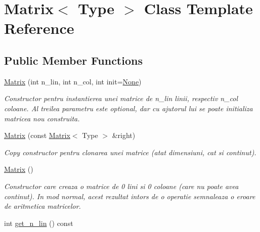 \hypertarget{classMatrix}{
\section{Matrix$<$ Type $>$ Class Template Reference}
\label{classMatrix}
}
\subsection*{Public Member Functions}
\begin{DoxyCompactItemize}
\item 
\hyperlink{classMatrix_a4543e4dacf7cfa454e45f2a3d655cb99}{Matrix} (int n\_\-lin, int n\_\-col, int init=\hyperlink{classMatrix_ac576343229d4c60eb7270123baf1eb08}{None})
\begin{DoxyCompactList}\small\item\em Constructor pentru instantierea unei matrice de {\itshape n\_\-lin\/} linii, respectiv {\itshape n\_\-col\/} coloane. Al treilea parametru este optional, dar cu ajutorul lui se poate initializa matricea nou construita. \item\end{DoxyCompactList}\item 
\hyperlink{classMatrix_a26ec7ce757009a97599b048379466841}{Matrix} (const \hyperlink{classMatrix}{Matrix}$<$ Type $>$ \&right)
\begin{DoxyCompactList}\small\item\em Copy constructor pentru clonarea unei matrice (atat dimensiuni, cat si continut). \item\end{DoxyCompactList}\item 
\hypertarget{classMatrix_ae653bc04255a76bf5275bfce4aec0e5f}{
\hyperlink{classMatrix_ae653bc04255a76bf5275bfce4aec0e5f}{Matrix} ()}
\label{classMatrix_ae653bc04255a76bf5275bfce4aec0e5f}

\begin{DoxyCompactList}\small\item\em Constructor care creaza o matrice de 0 lini si 0 coloane (care nu poate avea continut). In mod normal, acest rezultat intors de o operatie semnaleaza o eroare de aritmetica matricelor. \item\end{DoxyCompactList}\item 
\hypertarget{classMatrix_a3f2bd634a34d187bc3f5f4b1556ae8d6}{
int \hyperlink{classMatrix_a3f2bd634a34d187bc3f5f4b1556ae8d6}{get\_\-n\_\-lin} () const }
\label{classMatrix_a3f2bd634a34d187bc3f5f4b1556ae8d6}


\end{DoxyCompactItemize}
